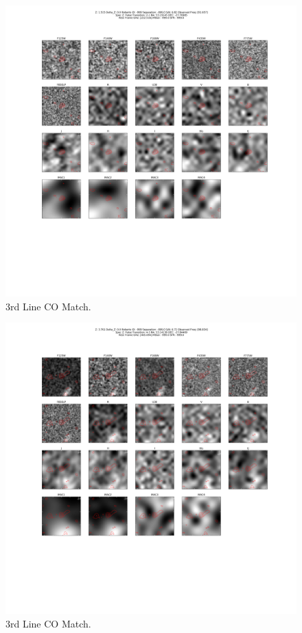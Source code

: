 \begin{figure}[tbp]
\centering \includegraphics[width=120mm]{Matched/ASPECS_Cutout_13.png}
\caption{3rd Line CO Match.}
\label{fig:Match_Three}
\end{figure}

\begin{figure}[tbp]
\centering \includegraphics[width=120mm]{Matched/ASPECS_Cutout_14.png}
\caption{3rd Line CO Match.}
\label{fig:Match_Three}
\end{figure}

